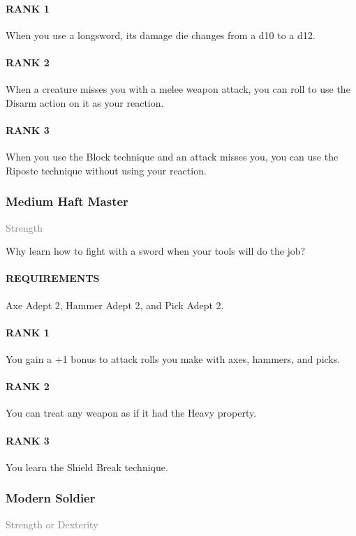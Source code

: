\paragraph{RANK 1} When you use a longsword, its damage die changes from a d10 to a d12.
\paragraph{RANK 2} When a creature misses you with a melee weapon attack, you can roll to use the Disarm action on it as your reaction.
\paragraph{RANK 3} When you use the Block technique and an attack misses you, you can use the Riposte technique without using your reaction.

\subsubsection{Medium Haft Master} \label{feat::mediumhaftmaster}
\small{\textcolor{gray}{Strength}}

\normalsize
Why learn how to fight with a sword when your tools will do the job?
\paragraph{REQUIREMENTS} Axe Adept 2, Hammer Adept 2, and Pick Adept 2.
\paragraph{RANK 1} You gain a +1 bonus to attack rolls you make with axes, hammers, and picks.
\paragraph{RANK 2} You can treat any weapon as if it had the Heavy property.
\paragraph{RANK 3} You learn the Shield Break technique.

\subsubsection{Modern Soldier} \label{feat::modernsoldier}
\small{\textcolor{gray}{Strength or Dexterity}}

